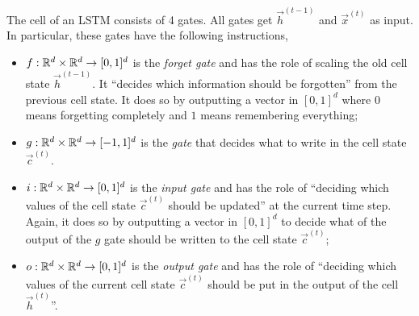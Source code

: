 The cell of an LSTM consists of 4 gates. All gates get $\vec{h}^{(t-1)}$ and $\vec{x}^{(t)}$ as
input. In particular, these gates have the following instructions,
\begin{itemize}
    \item $f: \mathbb{R}^d \times \mathbb{R}^d \to [0,1]^d$ is the \textit{forget gate} and has the role of scaling
          the old cell state $\vec{h}^{(t-1)}$. It ``decides which information should be forgotten''
          from the previous cell state. It does so by outputting a vector in $[0,1]^d$ where $0$ means
          forgetting completely and $1$ means remembering everything;

    \item $g: \mathbb{R}^d \times \mathbb{R}^d \to [-1, 1]^d$ is the \textit{gate} that decides what to write in the
          cell state $\vec{c}^{(t)}$.

    \item $i: \mathbb{R}^d \times \mathbb{R}^d \to [0,1]^d$ is the \textit{input gate} and has the role of ``deciding
          which values of the cell state $\vec{c}^{(t)}$ should be updated'' at the current time step.
          Again, it does so by outputting a vector in $[0,1]^d$ to decide what of the output of the $g$
          gate should be written to the cell state $\vec{c}^{(t)}$;

    \item $o: \mathbb{R}^d \times \mathbb{R}^d \to [0,1]^d$ is the \textit{output gate} and has the role of
          ``deciding which values of the current cell state $\vec{c}^{(t)}$ should be put in the output
          of the cell $\vec{h}^{(t)}$''.
\end{itemize}

